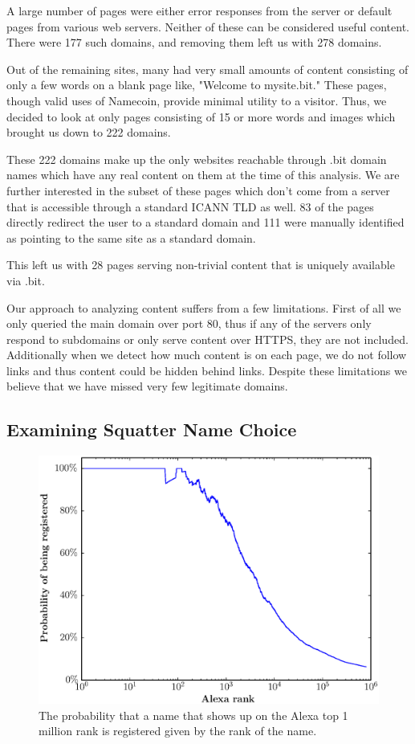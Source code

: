A large number of pages were either error responses from the server or default pages from various web servers. Neither of these can be considered useful content. There were 177 such domains, and removing them left us with 278 domains.

Out of the remaining sites, many had very small amounts of content consisting of only a few words on a blank page like, "Welcome to mysite.bit." These pages, though valid uses of Namecoin, provide minimal utility to a visitor. Thus, we decided to look at only pages consisting of 15 or more words and images which brought us down to 222 domains.

These 222 domains make up the only websites reachable through .bit domain names which have any real content on them at the time of this analysis. We are further interested in the subset of these pages which don't come from a server that is accessible through a standard ICANN TLD as well.  83 of the pages directly redirect the user to a standard domain and 111 were manually identified as pointing to the same site as a standard domain.

This left us with 28 pages serving non-trivial content that is uniquely available via .bit.

Our approach to analyzing content suffers from a few limitations. First of all we only queried the main domain over port 80, thus if any of the servers only respond to subdomains or only serve content over HTTPS, they are not included. Additionally when we detect how much content is on each page, we do not follow links and thus content could be hidden behind links. Despite these limitations we believe that we have missed very few legitimate domains.

\subsection{Examining Squatter Name Choice}

\begin{figure}[t]
  \centering
  \includegraphics[width=\columnwidth]{figures/alexa_probability}
  \caption{The probability that a name that shows up on the Alexa top 1 million rank is registered given by the rank of the name.}
  \label{fig:alexa_probability}
\end{figure}

